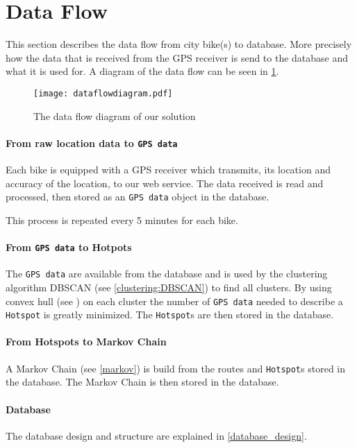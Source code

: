 \section{Data Flow}\label{data_flow}
This section describes the data flow from city bike(s) to database. More precisely how the data that is received from the GPS receiver is send to the database and what it is used for.
A diagram of the data flow can be seen in \cref{fig:dataFlowDiagram}.

\begin{figure}[H]
\texttt{[image: dataflowdiagram.pdf]}
\caption{The data flow diagram of our solution}
\label{fig:dataFlowDiagram}
\end{figure}

\paragraph{From raw location data to \texttt{GPS data}}
Each bike is equipped with a GPS receiver which transmits, its location and accuracy of the location, to our web service.
The data received is read and processed, then stored as an \texttt{GPS data} object in the database.

This process is repeated every 5 minutes for each bike.

\paragraph{From \texttt{GPS data} to Hotpots}
The \texttt{GPS data} are available from the database and is used by the clustering algorithm DBSCAN (see \cref{clustering:DBSCAN}) to find all clusters.
By using convex hull (see \cite[page 1031]{aadbook}) on each cluster the number of \texttt{GPS data} needed to describe a \texttt{Hotspot} is greatly minimized.
The \texttt{Hotspot}s are then stored in the database.

\paragraph{From Hotspots to Markov Chain}
A Markov Chain (see \cref{markov}) is build from the routes and \texttt{Hotspot}s stored in the database.
The Markov Chain is then stored in the database.

\paragraph{Database}
The database design and structure are explained in \cref{database_design}.

